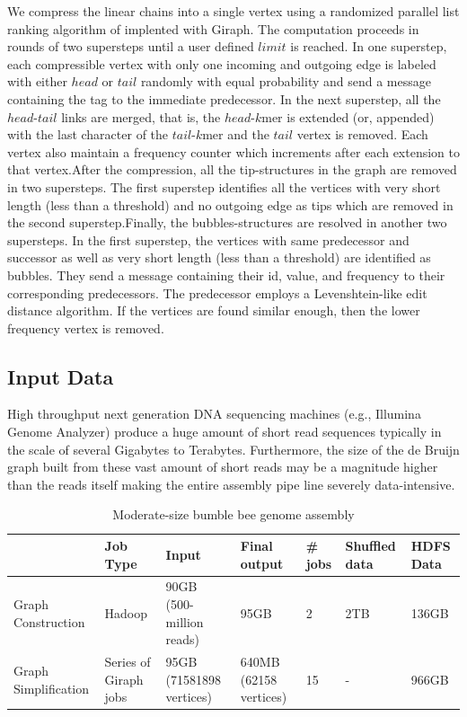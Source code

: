 \documentclass[conference]{IEEEtran}
\begin{document}
We compress the linear chains into a single vertex using a randomized parallel list ranking algorithm of \cite{algo:parallellistrank} implented with Giraph. The computation proceeds in rounds of two supersteps until a user defined $limit$ is reached. In one superstep, each compressible vertex with only one incoming and outgoing edge is labeled with either $head$ or $tail$ randomly with equal probability and send a message containing the tag to the immediate predecessor. In the next superstep, all the $head$-$tail$ links are merged, that is, the $head$-$k$mer is extended (or, appended) with the last character of the $tail$-$k$mer and the $tail$ vertex is removed. Each vertex also maintain a frequency counter which increments after each extension to that vertex.After the compression, all the tip-structures in the graph are removed in two supersteps. The first superstep identifies all the vertices with very short length (less than a threshold) and no outgoing edge as tips which are removed in the second superstep.Finally, the bubbles-structures are resolved in another two supersteps. In the first superstep, the vertices with same predecessor and successor as well as very short length (less than a threshold) are identified as bubbles. They send a message containing their id, value, and frequency to their corresponding predecessors. The predecessor employs a Levenshtein-like edit distance algorithm. If the vertices are found similar enough, then the lower frequency vertex is removed. 

\subsection {Input Data} \label{InputData}
High throughput next generation DNA sequencing machines (e.g., Illumina Genome Analyzer) produce a huge amount of short read sequences typically in the scale of several Gigabytes to Terabytes. Furthermore, the size of the de Bruijn graph built from these vast amount of short reads may be a magnitude higher than the reads itself making the entire assembly pipe line severely data-intensive.
\begin{table}
\begin{center}
    \begin{tabular}{ |p{1.1cm} | p{0.8cm} | p{1.1cm} | p{0.8cm} | p{0.8cm} | p{0.8cm} | p{0.8cm}|} \hline
    & Job Type & Input & Final output & \# jobs & Shuffled data & HDFS Data \\ \hline
    Graph Construction & Hadoop & 90GB (500-million reads) & 95GB & 2 & 2TB & 136GB \\ \hline
    Graph Simplification & Series of Giraph jobs & 95GB (71581898 vertices) & 640MB (62158 vertices) & 15 & - & 966GB \\ \hline    
    \end{tabular}
    \caption{Moderate-size bumble bee genome assembly}
	\label{table:BumbleBeeData}
\end{center}
\vspace{-3.0em}
\end{table}
\end{document}
